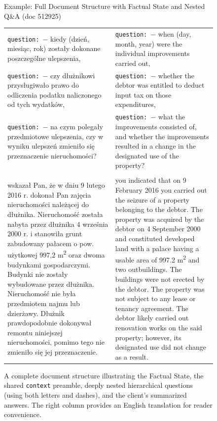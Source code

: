 \begin{figure}[!htb]
\begin{examplebox}{Example: Full Document Structure with Factual State and Nested Q\&A (doc 512925)}
\begin{tabularx}{\linewidth}{@{}>{\raggedright\arraybackslash}X@{\hspace{1em}}>{\raggedright\arraybackslash}X@{}}
\hspace{1em} \texttt{question:}~$-$ kiedy (dzień, miesiąc, rok) zostały dokonane poszczególne ulepszenia, &
\hspace{1em} \texttt{question:}~$-$ when (day, month, year) were the individual improvements carried out, \\
\addlinespace

\hspace{1em} \texttt{question:}~$-$ czy dłużnikowi przysługiwało prawo do odliczenia podatku naliczonego od tych wydatków, &
\hspace{1em} \texttt{question:}~$-$ whether the debtor was entitled to deduct input tax on those expenditures, \\
\addlinespace

\hspace{1em} \texttt{question:}~$-$ na czym polegały przedmiotowe ulepszenia, czy w wyniku ulepszeń zmieniło się przeznaczenie nieruchomości? &
\hspace{1em} \texttt{question:}~$-$ what the improvements consisted of, and whether the improvements resulted in a change in the designated use of the property? \\
\addlinespace

\midrule
\multicolumn{2}{@{}l}{\textbf{Client's Answers}} \\
\midrule
wskazał Pan, że w dniu 9 lutego 2016 r. dokonał Pan zajęcia nieruchomości należącej do dłużnika. Nieruchomość została nabyta przez dłużnika 4 września 2000 r. i stanowiła grunt zabudowany pałacem o pow. użytkowej 997,2 m\textsuperscript{2} oraz dwoma budynkami gospodarczymi. Budynki nie zostały wybudowane przez dłużnika. Nieruchomość nie była przedmiotem najmu lub dzierżawy. Dłużnik prawdopodobnie dokonywał remontu niniejszej nieruchomości, pomimo tego nie zmieniło się jej przeznaczenie.
&
you indicated that on 9 February 2016 you carried out the seizure of a property belonging to the debtor. The property was acquired by the debtor on 4 September 2000 and constituted developed land with a palace having a usable area of 997.2 m\textsuperscript{2} and two outbuildings. The buildings were not erected by the debtor. The property was not subject to any lease or tenancy agreement. The debtor likely carried out renovation works on the said property; however, its designated use did not change as a result. \\
\bottomrule
\end{tabularx}
\end{examplebox}
\caption{A complete document structure illustrating the Factual State, the shared \texttt{context} preamble, deeply nested hierarchical questions (using both letters and dashes), and the client's summarized answers. The right column provides an English translation for reader convenience.}
\label{fig:document-example-nested}
\end{figure}

